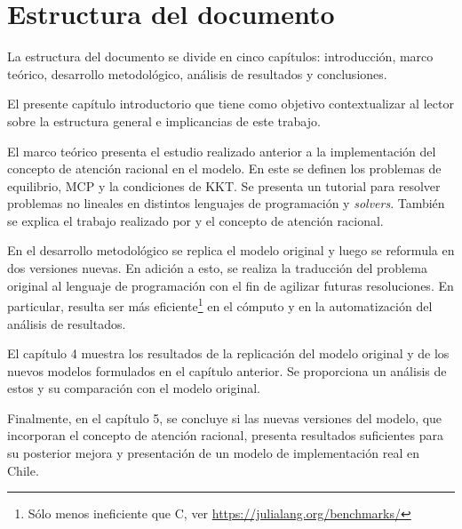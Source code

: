 \newpage
\section{Estructura del documento}

La estructura del documento se divide en cinco capítulos: introducción, marco teórico, desarrollo metodológico, análisis de resultados y conclusiones.
\vspace{2.5mm}

El presente capítulo introductorio que tiene como objetivo contextualizar al lector sobre la estructura general e implicancias de este trabajo.
\vspace{2.5mm}

El marco teórico presenta el estudio realizado anterior a la implementación del concepto de atención racional en el modelo. En este se definen los problemas de equilibrio, MCP y la condiciones de KKT. Se presenta un tutorial para resolver problemas no lineales en distintos lenguajes de programación y \textit{solvers}. También se explica el trabajo realizado por  y el concepto de atención racional.
\vspace{2.5mm}

En el desarrollo metodológico se replica el modelo original y luego se reformula en dos versiones nuevas. En adición a esto, se realiza la traducción del problema original al lenguaje de programación \julia con el fin de agilizar futuras resoluciones. En particular, \julia resulta ser más eficiente\footnote{Sólo menos ineficiente que C, ver \url{https://julialang.org/benchmarks/}} en el cómputo y en la automatización del análisis de resultados.
\vspace{2.5mm}

El capítulo 4 muestra los resultados de la replicación del modelo original y de los nuevos modelos formulados en el capítulo anterior. Se proporciona un análisis de estos y su comparación con el modelo original.
\vspace{2.5mm}

Finalmente, en el capítulo 5, se concluye si las nuevas versiones del modelo, que incorporan el concepto de atención racional, presenta resultados suficientes para su posterior mejora y presentación de un modelo de implementación real en Chile.



